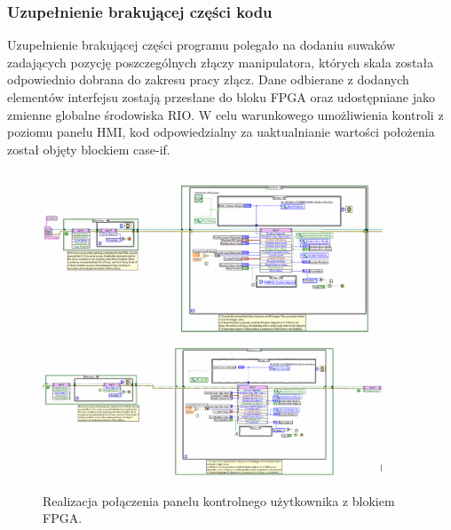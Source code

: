 \documentclass[margin = 2cm]{article}
\begin{document}
  		\subsubsection{Uzupełnienie brakującej części kodu}
Uzupełnienie brakującej części programu polegało na dodaniu suwaków zadających pozycję poszczególnych złączy manipulatora, których skala została odpowiednio dobrana do zakresu pracy złącz. Dane odbierane z dodanych elementów interfejsu zostają przesłane do bloku FPGA oraz udostępniane jako zmienne globalne środowiska RIO. W celu warunkowego umożliwienia kontroli z poziomu panelu HMI, kod odpowiedzialny za uaktualnianie wartości położenia został objęty blockiem case-if.
	\begin{figure}[H]
		\centering
		\includegraphics[width=0.9\textwidth]{3_1}
		\includegraphics[width=0.9\textwidth]{3_2}
		\caption{Realizacja połączenia panelu kontrolnego użytkownika z blokiem FPGA.}
	\end{figure}
\end{document}
